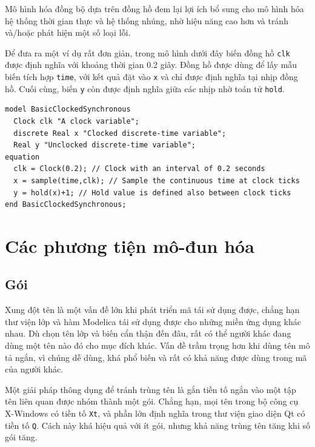 Mô hình hóa đồng bộ dựa trên đồng hồ đem lại lợi ích bổ sung cho mô hình hóa hệ thống thời gian thực và hệ thống nhúng, nhờ hiệu năng cao hơn và tránh và/hoặc phát hiện một số loại lỗi.

Để đưa ra một ví dụ rất đơn giản, trong mô hình dưới đây biến đồng hồ \texttt{clk} được định nghĩa với khoảng thời gian 0.2 giây. Đồng hồ được dùng để lấy mẫu biến tích hợp \texttt{time}, với kết quả đặt vào \texttt{x} và chỉ được định nghĩa tại nhịp đồng hồ. Cuối cùng, biến \texttt{y} còn được định nghĩa giữa các nhịp nhờ toán tử \texttt{hold}.
\begin{verbatim}
model BasicClockedSynchronous
  Clock clk "A clock variable";
  discrete Real x "Clocked discrete-time variable";
  Real y "Unclocked discrete-time variable";
equation
  clk = Clock(0.2); // Clock with an interval of 0.2 seconds
  x = sample(time,clk); // Sample the continuous time at clock ticks
  y = hold(x)+1; // Hold value is defined also between clock ticks
end BasicClockedSynchronous;
\end{verbatim}

\section{Các phương tiện mô-đun hóa}
\subsection{Gói}
Xung đột tên là một vấn đề lớn khi phát triển mã tái sử dụng được, chẳng hạn thư viện lớp và hàm Modelica tái sử dụng được cho những miền ứng dụng khác nhau. Dù chọn tên lớp và biến cẩn thận đến đâu, rất có thể người khác đang dùng một tên nào đó cho mục đích khác. Vấn đề trầm trọng hơn khi dùng tên mô tả ngắn, vì chúng dễ dùng, khá phổ biến và rất có khả năng được dùng trong mã của người khác.

Một giải pháp thông dụng để tránh trùng tên là gắn tiền tố ngắn vào một tập tên liên quan được nhóm thành một gói. Chẳng hạn, mọi tên trong bộ công cụ X-Windows có tiền tố \texttt{Xt}, và phần lớn định nghĩa trong thư viện giao diện Qt có tiền tố \texttt{Q}. Cách này khá hiệu quả với ít gói, nhưng khả năng trùng tên tăng khi số gói tăng.

